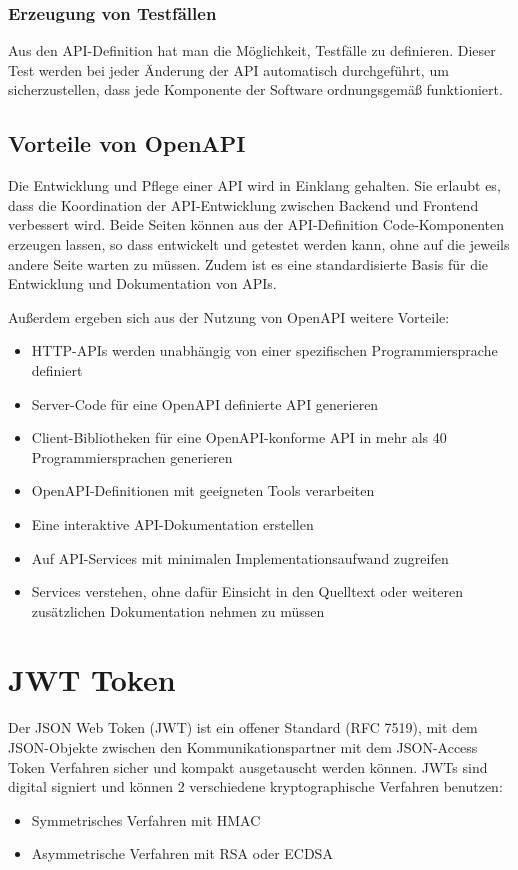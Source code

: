 \subsubsection{Erzeugung von Testfällen}
Aus den API-Definition hat man die Möglichkeit, Testfälle zu definieren. Dieser Test werden bei jeder Änderung der API automatisch durchgeführt, 
um sicherzustellen, dass jede Komponente der Software ordnungsgemäß funktioniert.

\subsection{Vorteile von OpenAPI}
Die Entwicklung und Pflege einer API wird in Einklang gehalten. Sie erlaubt es, dass die Koordination der API-Entwicklung zwischen Backend und 
Frontend verbessert wird. Beide Seiten können aus der API-Definition Code-Komponenten erzeugen lassen, so dass entwickelt und getestet werden kann, 
ohne auf die jeweils andere Seite warten zu müssen. Zudem ist es eine standardisierte Basis für die Entwicklung und Dokumentation von APIs.

Außerdem ergeben sich aus der Nutzung von OpenAPI weitere Vorteile:
\begin{itemize}
    \item HTTP-APIs werden unabhängig von einer spezifischen Programmiersprache definiert
    \item Server-Code für eine OpenAPI definierte API generieren
    \item Client-Bibliotheken für eine OpenAPI-konforme API in mehr als 40 Programmiersprachen generieren
    \item OpenAPI-Definitionen mit geeigneten Tools verarbeiten
    \item Eine interaktive API-Dokumentation erstellen
    \item Auf API-Services mit minimalen Implementationsaufwand zugreifen
    \item Services verstehen, ohne dafür Einsicht in den Quelltext oder weiteren zusätzlichen Dokumentation nehmen zu müssen
\end{itemize}

\newpage
\section{JWT Token}
\cite{JWTio}
\cite{JWTSecurityInsider}

Der JSON Web Token (JWT) ist ein offener Standard (RFC 7519), mit dem JSON-Objekte zwischen den Kommunikationspartner mit dem JSON-Access Token Verfahren 
sicher und kompakt ausgetauscht werden können. JWTs sind digital signiert und können 2 verschiedene kryptographische Verfahren benutzen:
\begin{itemize}
    \item Symmetrisches Verfahren mit HMAC
    \item Asymmetrische Verfahren mit RSA oder ECDSA
\end{itemize}


